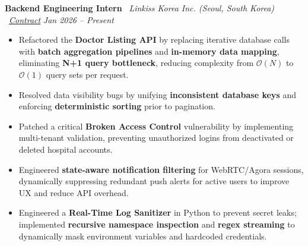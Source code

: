 \documentclass[a4paper,10pt]{article}
\newcommand{\ulhref}[2]{\href{#1}{\uline{#2}}}
\begin{document}
\textbf{Backend Engineering Intern} \textbar\ \textit{Linkiss Korea Inc. (Seoul, South Korea)} \textbar\ \textit{\ulhref{https://drive.google.com/file/d/1XUQSmp2AWRXqGVOLyPhuP5WjdLKun7tz/view}{Contract}} \hfill \textit{Jan 2026 -- Present}
\begin{itemize}
    \item Refactored the \textbf{Doctor Listing API} by replacing iterative database calls with \textbf{batch aggregation pipelines} and \textbf{in-memory data mapping}, eliminating \textbf{N+1 query bottleneck}, reducing complexity from $\mathcal{O}(N)$ to $\mathcal{O}(1)$ query sets per request.
    \item Resolved data visibility bugs by unifying \textbf{inconsistent database keys} and enforcing \textbf{deterministic sorting} prior to pagination.
\item Patched a critical \textbf{Broken Access Control} vulnerability by implementing multi-tenant validation, preventing unauthorized logins from deactivated or deleted hospital accounts.
\item Engineered \textbf{state-aware notification filtering} for WebRTC/Agora sessions, dynamically suppressing redundant push alerts for active users to improve UX and reduce API overhead.\item Engineered a \textbf{Real-Time Log Sanitizer} in Python to prevent secret leaks; implemented \textbf{recursive namespace inspection} and \textbf{regex streaming} to dynamically mask environment variables and hardcoded credentials.
\end{itemize}
\end{document}
